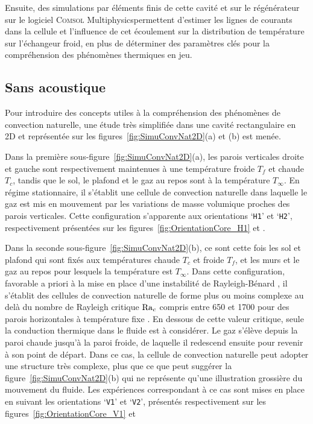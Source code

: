 Ensuite, des simulations par éléments finis de cette cavité et sur le régénérateur sur le logiciel \textsc{Comsol} Multiphysics\textss\textregistered permettent d'estimer les lignes de courants dans la cellule et l'influence de cet écoulement sur la distribution de température sur l'échangeur froid, en plus de déterminer des paramètres clés pour la compréhension des phénomènes thermiques en jeu.

\subsection{Sans acoustique}
Pour introduire des concepts utiles à la compréhension des phénomènes de convection naturelle, une étude très simplifiée dans une cavité rectangulaire en 2D et représentée sur les figures~\ref{fig:SimuConvNat2D}{\color{MatlabBlue}(a)} et {\color{MatlabBlue}(b)} est menée. 

Dans la première sous-figure~\ref{fig:SimuConvNat2D}{\color{MatlabBlue}(a)}, les parois verticales droite et gauche sont respectivement maintenues à une température froide $T_f$ et chaude $T_c$, tandis que le sol, le plafond et le gaz au repos sont à la température $T_\infty$. En régime stationnaire, il s'établit une cellule de convection naturelle dans laquelle le gaz est mis en mouvement par les  variations de masse volumique proches des parois verticales. Cette configuration s'apparente aux orientations `\texttt{H1}' et `\texttt{H2}', respectivement présentées sur les figures~\ref{fig:OrientationCore_H1} et .

Dans la seconde sous-figure~\ref{fig:SimuConvNat2D}{\color{MatlabBlue}(b)}, ce sont cette fois les sol et plafond qui sont fixés aux températures chaude $T_c$ et froide $T_f$, et les murs et le gaz au repos pour lesquels la température est $T_\infty$. Dans cette configuration, favorable a priori à la mise en place d'une instabilité de \og Rayleigh-Bénard \fg{}, il s'établit des cellules de convection naturelle de forme plus ou moins complexe au delà du nombre de Rayleigh critique $\mathrm{Ra}_c$ compris entre 650 et 1700 pour des parois horizontales à température fixe \cite{getling_rayleigh-benard_1998}. En dessous de cette valeur critique, seule la conduction thermique dans le fluide est à considérer. Le gaz s'élève depuis la paroi chaude jusqu'à la paroi froide, de laquelle il redescend ensuite pour revenir à son point de départ. Dans ce cas, la cellule de convection naturelle peut adopter une structure très complexe, plus que ce que peut suggérer la figure~\ref{fig:SimuConvNat2D}{\color{MatlabBlue}(b)} qui ne représente qu'une illustration grossière du mouvement du fluide. Les expériences correspondant à ce cas sont mises en place en suivant les orientations `\texttt{V1}' et `\texttt{V2}', présentés respectivement sur les figures~\ref{fig:OrientationCore_V1} et 

